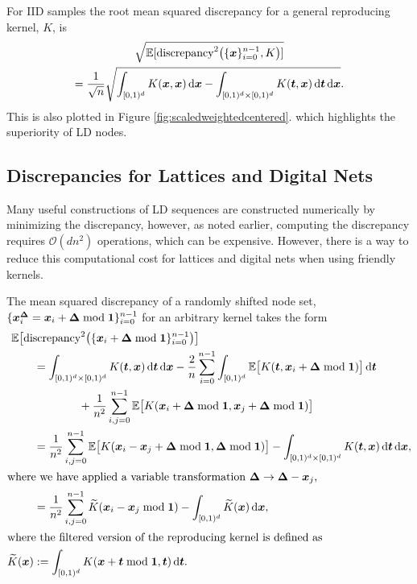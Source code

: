 \documentclass{svproc}
\begin{document}
For IID samples the root mean squared discrepancy for a general reproducing kernel, $K$, is
\begin{multline} \label{eq:discIID}
    \sqrt{\mathbb{E}[\text{discrepancy}^2\bigl(\{{\boldsymbol{x}}\}_{i=0}^{n-1},K \bigr)] } \\
    = \frac 1{\sqrt{n}}  \sqrt{  \int_{[0,1)^d} K({\boldsymbol{x}},{\boldsymbol{x}}) \, \mathrm{d} {\boldsymbol{x}} -
	 \int_{[0,1)^d \times [0,1)^d} K({\boldsymbol{t}},{\boldsymbol{x}}) \, \mathrm{d} {\boldsymbol{t}} \, \mathrm{d} {\boldsymbol{x}}}.
\end{multline}
This is also plotted in Figure \ref{fig:scaledweightedcentered}. which highlights the superiority of LD nodes.

\subsection{Discrepancies for Lattices and Digital Nets} \label{sec:latticenetdis}
Many useful constructions of LD sequences are constructed numerically by minimizing the discrepancy, however, as noted earlier, computing the discrepancy requires $\mathcal{O}(dn^2)$ operations, which can be expensive.  However, there is a way to reduce this computational cost for lattices and digital nets when using friendly kernels.

The mean squared discrepancy of a randomly shifted node set, $\{{\boldsymbol{x}}_i^{{\boldsymbol{\Delta}}} =  {\boldsymbol{x}}_i + {\boldsymbol{\Delta}} \bmod {\boldsymbol{1}} \}_{i=0}^{n-1}$ for an arbitrary kernel takes the form
\begin{align}
\nonumber
\MoveEqLeft \mathbb{E}\bigl[\text{discrepancy}^2 \bigl (\{ \bsx_{i} + \bsDelta \bmod \bsone \}_{i=0}^{n-1} \bigr) \bigr] \\
\nonumber
& = \int_{[0,1)^d \times [0,1)^d} K(\bst,\bsx) \, \mathrm{d} \bst \, \mathrm{d} \bsx  -\frac 2n  \sum_{i=0}^{n-1}  \int_{[0,1)^d} \mathbb{E} \bigl [K(\bst,\bsx_i + \bsDelta \bmod \bsone) \bigr]  \, \mathrm{d} \bst \\
\nonumber
	& \qquad \qquad + \frac{1}{n^2} \sum_{i,j=0}^{n-1}  \mathbb{E} \bigl [ K(\bsx_i + \bsDelta \bmod \bsone,\bsx_j + \bsDelta \bmod \bsone) \bigr] \\
\nonumber
    & = \frac{1}{n^2} \sum_{i,j=0}^{n-1}  \mathbb{E} \bigl [ K(\bsx_i - \bsx_j  + \bsDelta \bmod \bsone, \bsDelta \bmod \bsone) \bigr] - \int_{[0,1)^d \times [0,1)^d} K(\bst,\bsx) \, \mathrm{d} \bst \, \mathrm{d} \bsx ,\\
    \intertext{where we have applied a variable transformation $\bsDelta \to \bsDelta - \bsx_j$,}
    & = \frac{1}{n^2} \sum_{i,j=0}^{n-1}  \widetilde{K}(\bsx_i - \bsx_j \bmod \bsone ) - \int_{[0,1)^d} \widetilde{K}(\bsx) \, \mathrm{d} \bsx, \\
    \intertext{where the filtered version of the reproducing kernel is defined as}
    \widetilde{K}(\bsx) &: = \int_{[0,1)^d} K(\bsx + \bst \bmod \bsone, \bst) \, \mathrm{d} \bst.
\end{align}
\end{document}
